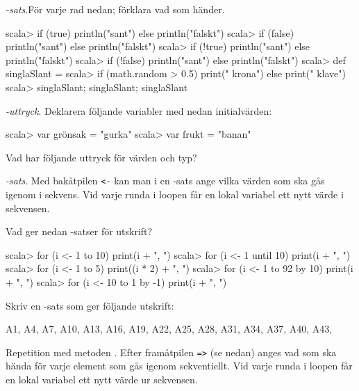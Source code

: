 {{{{{{{\Task {}\textit{-sats}.För varje rad nedan; förklara vad som händer.  %
\begin{REPL}
scala> if (true) println("sant") else println("falskt")
scala> if (false) println("sant") else println("falskt")
scala> if (!true) println("sant") else println("falskt")
scala> if (!false) println("sant") else println("falskt")
scala> def singlaSlant = 
scala> 	 if (math.random > 0.5) print(" krona") else print(" klave")
scala> singlaSlant; singlaSlant; singlaSlant
\end{REPL}


\Task {}\textit{-uttryck}. Deklarera följande variabler med nedan initialvärden:  %

\begin{REPLnonum}
scala> var grönsak = "gurka"
scala> var frukt = "banan"
\end{REPLnonum}

Vad har följande uttryck för värden och typ?

\Subtask {}

\Subtask {}

\Subtask {}

\Subtask {}

\Subtask {}


\Task {}\textit{-sats}.  Med bakåtpilen \texttt{<-} kan man i en -sats ange vilka värden som ska gås igenom i sekvens. Vid varje runda i loopen får en lokal variabel ett nytt värde i sekvensen. %

\Subtask Vad ger nedan -satser för utskrift?

\begin{REPL}
scala> for (i <- 1 to 10) print(i + ", ")
scala> for (i <- 1 until 10) print(i + ", ")
scala> for (i <- 1 to 5) print((i * 2) + ", ")
scala> for (i <- 1 to 92 by 10) print(i + ", ")
scala> for (i <- 10 to 1 by -1) print(i + ", ")
\end{REPL}

\Subtask Skriv en -sats som ger följande utskrift:
\begin{REPLnonum}
A1, A4, A7, A10, A13, A16, A19, A22, A25, A28, A31, A34, A37, A40, A43, 
\end{REPLnonum}

\Task Repetition med metoden . Efter framåtpilen \texttt{=>} (se nedan) anges vad som ska hända för varje element som gås igenom sekventiellt. Vid varje runda i loopen får en lokal variabel ett nytt värde ur sekvensen.   %

}}}}}}}
